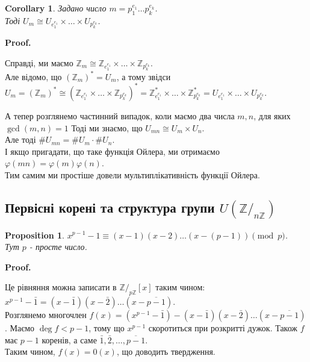 \documentclass[a4paper, 10pt]{article}
\makeatletter
\theoremstyle{theoremdd}
\theoremstyle{theoremdd}
\theoremstyle{theoremdd}
\theoremstyle{theoremdd}
\theoremstyle{theoremdd}
\newtheorem{proposition}[theorem]{Proposition}
\theoremstyle{theoremdd}
\theoremstyle{theoremdd}
\theoremstyle{theoremdd}
\newtheorem{corollary}[theorem]{Corollary}
\renewenvironment{proof}[1][Proof.\\]{\par
\pushQED{\hfill \qed}%
\normalfont \topsep6\p@\@plus6\p@\relax
\trivlist
\item\relax
{\bfseries
#1\@addpunct{.}}\hspace\labelsep\ignorespaces
}{%
\popQED\endtrivlist\@endpefalse
}
\makeatother
\begin{document}
\begin{corollary}
Задано число $m = p_1^{e_1} \dots p_k^{e_k}$.\\
Тоді $U_m \cong U_{e_1^{e_1}} \times \dots \times U_{p_k^{e_k}}$.
\end{corollary}

\begin{proof}
Справді, ми маємо $\mathbb{Z}_m \cong \mathbb{Z}_{e_1^{e_1}} \times \dots \times \mathbb{Z}_{p_k^{e_k}}$.\\
Але відомо, що $(\mathbb{Z}_m)^* = U_m$, а тому звідси\\
$U_m = (\mathbb{Z}_m)^* \cong (\mathbb{Z}_{e_1^{e_1}} \times \dots \times \mathbb{Z}_{p_k^{e_k}})^* = \mathbb{Z}^*_{e_1^{e_1}} \times \dots \times \mathbb{Z}^*_{p_k^{e_k}} = U_{e_1^{e_1}} \times \dots \times U_{p_k^{e_k}}$.
\end{proof}

А тепер розглянемо частинний випадок, коли маємо два числа $m,n$, для яких $\gcd(m,n) = 1$ Тоді ми знаємо, що $U_{mn} \cong U_m \times U_n$.\\
Але тоді $\# U_{mn} = \# U_m \cdot \# U_n$.\\
І якщо пригадати, що таке функція Ойлера, ми отримаємо\\
$\varphi(mn) = \varphi(m)\varphi(n)$.\\
Тим самим ми простіше довели мультиплікативність функції Ойлера.

\subsection{Первісні корені та структура групи $U(\mathbb{Z}/_{n\mathbb{Z}})$}
\begin{proposition}
$x^{p-1} - 1 \equiv (x-1)(x-2) \dots (x-(p-1)) \pmod p$.\\
Тут $p$ - просте число.
\end{proposition}

\begin{proof}
Це рівняння можна записати в $\mathbb{Z}/_{p \mathbb{Z}}[x]$ таким чином:\\
$x^{p-1} - \bar{1} = (x-\bar{1})(x-\bar{2}) \dots (x-\overline{p-1})$.\\
Розглянемо многочлен $f(x) = (x^{p-1} - \bar{1}) - (x-\bar{1})(x-\bar{2}) \dots (x-\overline{p-1})$. Маємо $\deg f < p-1$, тому що $x^{p-1}$ скоротиться при розкритті дужок. Також $f$ має $p-1$ коренів, а саме $\bar{1},\bar{2},\dots,\overline{p-1}$.\\
Таким чином, $f(x) = 0(x)$, що доводить твердження.
\end{proof}
\end{document}
